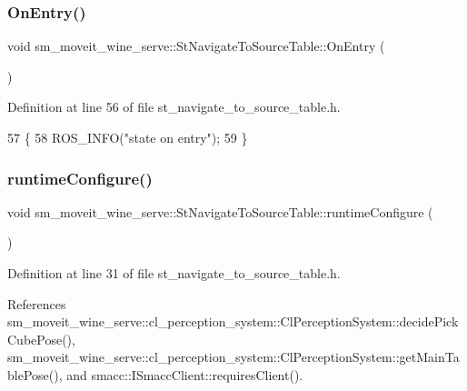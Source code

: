 \subsubsection{\texorpdfstring{On\+Entry()}{OnEntry()}}
{\footnotesize\ttfamily void sm\+\_\+moveit\+\_\+wine\+\_\+serve\+::\+St\+Navigate\+To\+Source\+Table\+::\+On\+Entry (\begin{DoxyParamCaption}{ }\end{DoxyParamCaption})\hspace{0.3cm}{\ttfamily [inline]}}



Definition at line 56 of file st\+\_\+navigate\+\_\+to\+\_\+source\+\_\+table.\+h.


\begin{DoxyCode}
57         \{
58             ROS\_INFO(\textcolor{stringliteral}{"state on entry"});
59         \}
\end{DoxyCode}
\mbox{\label{structsm__moveit__wine__serve_1_1StNavigateToSourceTable_a0824dc79b8a2749eaa90b1d27217c5ab}} 
\subsubsection{\texorpdfstring{runtime\+Configure()}{runtimeConfigure()}}
{\footnotesize\ttfamily void sm\+\_\+moveit\+\_\+wine\+\_\+serve\+::\+St\+Navigate\+To\+Source\+Table\+::runtime\+Configure (\begin{DoxyParamCaption}{ }\end{DoxyParamCaption})\hspace{0.3cm}{\ttfamily [inline]}}



Definition at line 31 of file st\+\_\+navigate\+\_\+to\+\_\+source\+\_\+table.\+h.



References sm\+\_\+moveit\+\_\+wine\+\_\+serve\+::cl\+\_\+perception\+\_\+system\+::\+Cl\+Perception\+System\+::decide\+Pick\+Cube\+Pose(), sm\+\_\+moveit\+\_\+wine\+\_\+serve\+::cl\+\_\+perception\+\_\+system\+::\+Cl\+Perception\+System\+::get\+Main\+Table\+Pose(), and smacc\+::\+I\+Smacc\+Client\+::requires\+Client().


